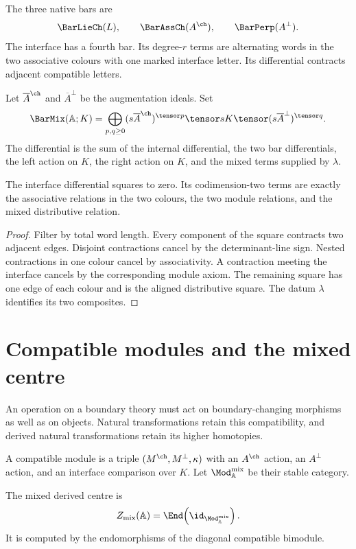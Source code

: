The three native bars are
\[
 \BarLieCh(L),\qquad
 \BarAssCh(A^{\ch}),\qquad
 \BarPerp(A^\perp).
\]
The interface has a fourth bar.  Its degree-$r$ terms are alternating words in the two associative colours with one marked interface letter.  Its differential contracts adjacent compatible letters.

\begin{construction}
Let $\overline A^{\ch}$ and $\overline A^\perp$ be the augmentation ideals.  Set
\[
 \BarMix(\mathbb A;K)
 =\bigoplus_{p,q\ge0}
 (s\overline A^{\ch})^{\tensor p}\tensor sK\tensor
 (s\overline A^\perp)^{\tensor q}.
\]
The differential is the sum of the internal differential, the two bar differentials, the left action on $K$, the right action on $K$, and the mixed terms supplied by $\lambda$.
\end{construction}

\begin{theorem}
The interface differential squares to zero.  Its codimension-two terms are exactly the associative relations in the two colours, the two module relations, and the mixed distributive relation.
\end{theorem}
\begin{proof}
Filter by total word length.  Every component of the square contracts two adjacent edges.  Disjoint contractions cancel by the determinant-line sign.  Nested contractions in one colour cancel by associativity.  A contraction meeting the interface cancels by the corresponding module axiom.  The remaining square has one edge of each colour and is the aligned distributive square.  The datum $\lambda$ identifies its two composites.
\end{proof}

\chapter{Compatible modules and the mixed centre}
An operation on a boundary theory must act on boundary-changing morphisms as well as on objects. Natural transformations retain this compatibility, and derived natural transformations retain its higher homotopies.

A compatible module is a triple $(M^{\ch},M^\perp,\kappa)$ with an $A^{\ch}$ action, an $A^\perp$ action, and an interface comparison over $K$.  Let $\Mod_{\mathbb A}^{\mathrm{mix}}$ be their stable category.

\begin{definition}
The mixed derived centre is
\[
 Z_{\mathrm{mix}}(\mathbb A)
 =\End\!\left(\id_{\Mod_{\mathbb A}^{\mathrm{mix}}}\right).
\]
It is computed by the endomorphisms of the diagonal compatible bimodule.
\end{definition}

